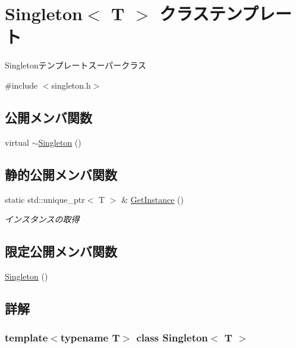 \hypertarget{class_singleton}{}\section{Singleton$<$ T $>$ クラステンプレート}
\label{class_singleton}


Singletonテンプレートスーパークラス  




{\ttfamily \#include $<$singleton.\+h$>$}

\subsection*{公開メンバ関数}
\begin{DoxyCompactItemize}
\item 
virtual \mbox{\hyperlink{class_singleton_ad3c93143836479fb3dd96b21b795938c}{$\sim$\+Singleton}} ()
\end{DoxyCompactItemize}
\subsection*{静的公開メンバ関数}
\begin{DoxyCompactItemize}
\item 
static std\+::unique\+\_\+ptr$<$ T $>$ \& \mbox{\hyperlink{class_singleton_a57b10e4aa6d89bbac3a16355914655b3}{Get\+Instance}} ()
\begin{DoxyCompactList}\small\item\em インスタンスの取得 \end{DoxyCompactList}\end{DoxyCompactItemize}
\subsection*{限定公開メンバ関数}
\begin{DoxyCompactItemize}
\item 
\mbox{\hyperlink{class_singleton_a923b995920da9c06590adb170ab2f890}{Singleton}} ()
\end{DoxyCompactItemize}


\subsection{詳解}
\subsubsection*{template$<$typename T$>$\newline
class Singleton$<$ T $>$}

